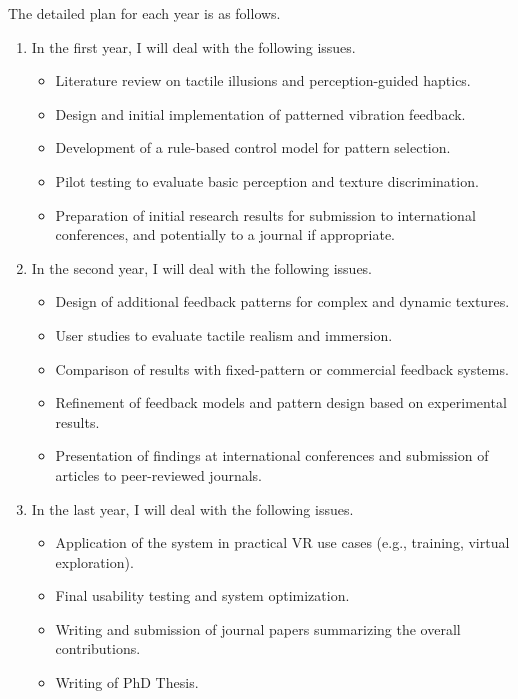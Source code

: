 \documentclass[graybox]{svmult}
\begin{document}
The detailed plan for each year is as follows.
\begin{enumerate}
	\item In the first year, I will deal with the following issues.
	      \begin{itemize}
		      \item Literature review on tactile illusions and perception-guided haptics.
		      \item Design and initial implementation of patterned vibration feedback.
		      \item Development of a rule-based control model for pattern selection.
		      \item Pilot testing to evaluate basic perception and texture discrimination.
		      \item Preparation of initial research results for submission to international conferences, and potentially to a journal if appropriate.
	      \end{itemize}
	\item In the second year, I will deal with the following issues.
	      \begin{itemize}
		      \item Design of additional feedback patterns for complex and dynamic textures.
		      \item User studies to evaluate tactile realism and immersion.
		      \item Comparison of results with fixed-pattern or commercial feedback systems.
		      \item Refinement of feedback models and pattern design based on experimental results.
			  \item Presentation of findings at international conferences and submission of articles to peer-reviewed journals.
	      \end{itemize}
	\item In the last year, I will deal with the following issues.
	      \begin{itemize}
		      \item Application of the system in practical VR use cases (e.g., training, virtual exploration).
		      \item Final usability testing and system optimization.
		      \item Writing and submission of journal papers summarizing the overall contributions.
		      \item Writing of PhD Thesis.
	      \end{itemize}
\end{enumerate}


% 
% 
\end{document}
